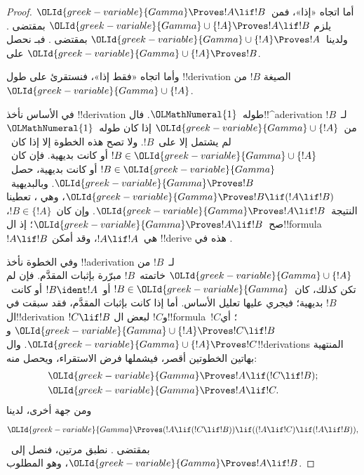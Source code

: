 \documentclass[../../../include/open-logic-section]{subfiles}
\begin{document}
\begin{proof}
أما اتجاه «إذا»، فمن~${\OLId{greek-variable}{Gamma}} \Proves !A \lif !B$ يلزم
${\OLId{greek-variable}{Gamma}} \cup \{!A\} \Proves !A \lif !B$ بمقتضى
. ولدينا~${\OLId{greek-variable}{Gamma}} \cup \{!A\} \Proves !A$
بمقتضى . فبـ نحصل على
${\OLId{greek-variable}{Gamma}} \cup \{!A\} \Proves !B$.


وأما اتجاه «فقط إذا»، فنستقرئ على طول !!{derivation} الصيغة
$!B$ من~${\OLId{greek-variable}{Gamma}} \cup \{!A\}$.

في الأساس نأخذ !!{derivation} طوله~${\OLMathNumeral{1}}$.
فال!!^a{derivation} لـ~$!B$ من~${\OLId{greek-variable}{Gamma}} \cup \{!A\}$ إذا كان
طوله~${\OLMathNumeral{1}}$ لم يشتمل إلا على~$!B$. ولا تصح هذه الخطوة إلا إذا
كان~$!B \in {\OLId{greek-variable}{Gamma}} \cup \{!A\}$ أو كانت بديهية.
فإن كان~$!B \in {\OLId{greek-variable}{Gamma}}$ أو كانت بديهية، حصل~${\OLId{greek-variable}{Gamma}} \Proves !B$.
وبالبديهية~${\OLId{greek-variable}{Gamma}}
\Proves !B \lif (!A \lif !B)$، وهي ،
تعطينا  النتيجة~${\OLId{greek-variable}{Gamma}} \Proves !A \lif !B$.
وإن كان~$!B \in \{ !A\}$، صح~${\OLId{greek-variable}{Gamma}} \Proves !A \lif !B$؛
إذ ال!!{formula}~$!A \lif !B$ هي~$!A \lif !A$،
وقد أمكن !!{derive} هذه في .

وفي الخطوة نأخذ !!a{derivation} لـ~$!B$ من
${\OLId{greek-variable}{Gamma}} \cup \{!A\}$ خاتمته~$!B$ مبرّرة بإثبات المقدَّم.
فإن لم تكن كذلك، كان~$!B \in {\OLId{greek-variable}{Gamma}}$ أو~$!B
\ident !A$ أو كانت~$!B$ بديهية؛ فيجري عليها تعليل الأساس.
أما إذا كانت بإثبات المقدَّم، فقد سبقت في ال!!{derivation}
$!C \lif !B$ و$!C$ لبعض ال!!{formula}~$!C$؛ أي
${\OLId{greek-variable}{Gamma}} \cup \{!A\} \Proves !C \lif !B$ و${\OLId{greek-variable}{Gamma}} \cup \{!A\}
\Proves !C$. وال!!{derivation}s المنتهية بهاتين الخطوتين أقصر،
فيشملها فرض الاستقراء، ويحصل منه:
\begin{align*}
  & {\OLId{greek-variable}{Gamma}} \Proves !A \lif (!C \lif !B); \\
  & {\OLId{greek-variable}{Gamma}} \Proves !A \lif !C.
\end{align*}
ومن جهة أخرى، لدينا
\[
{\OLId{greek-variable}{Gamma}} \Proves (!A \lif (!C \lif !B)) \lif
((!A\lif !C)  \lif (!A \lif !B)),
\]
بمقتضى . نطبق  مرتين،
فنصل إلى~${\OLId{greek-variable}{Gamma}} \Proves !A \lif !B$، وهو المطلوب.
\end{proof}
\end{document}
